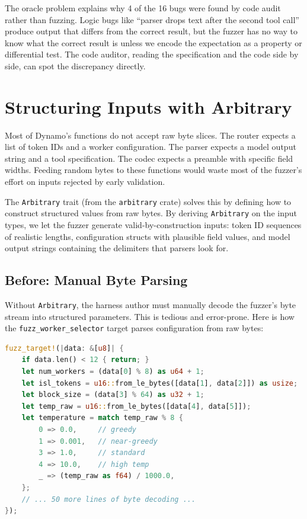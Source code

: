 \begin{notebox}
The oracle problem explains why 4 of the 16 bugs were found by code audit rather than fuzzing. Logic bugs like ``parser drops text after the second tool call'' produce output that differs from the correct result, but the fuzzer has no way to know what the correct result is unless we encode the expectation as a property or differential test. The code auditor, reading the specification and the code side by side, can spot the discrepancy directly.
\end{notebox}

\section{Structuring Inputs with Arbitrary}
\label{sec:fuzzing:arbitrary}

%
Most of Dynamo's functions do not accept raw byte slices. The router expects a list of token IDs and a worker configuration. The parser expects a model output string and a tool specification. The codec expects a preamble with specific field widths. Feeding random bytes to these functions would waste most of the fuzzer's effort on inputs rejected by early validation.

The \texttt{Arbitrary} trait (from the \texttt{arbitrary} crate) solves this by defining how to construct structured values from raw bytes. By deriving \texttt{Arbitrary} on the input types, we let the fuzzer generate valid-by-construction inputs: token ID sequences of realistic lengths, configuration structs with plausible field values, and model output strings containing the delimiters that parsers look for.

\subsection{Before: Manual Byte Parsing}

Without \texttt{Arbitrary}, the harness author must manually decode the fuzzer's byte stream into structured parameters. This is tedious and error-prone. Here is how the \texttt{fuzz\_worker\_selector} target parses configuration from raw bytes:

\begin{lstlisting}[language=Rust,caption={Manual input parsing: extracting structured fields from raw bytes.}]
fuzz_target!(|data: &[u8]| {
    if data.len() < 12 { return; }
    let num_workers = (data[0] % 8) as u64 + 1;
    let isl_tokens = u16::from_le_bytes([data[1], data[2]]) as usize;
    let block_size = (data[3] % 64) as u32 + 1;
    let temp_raw = u16::from_le_bytes([data[4], data[5]]);
    let temperature = match temp_raw % 8 {
        0 => 0.0,     // greedy
        1 => 0.001,   // near-greedy
        3 => 1.0,     // standard
        4 => 10.0,    // high temp
        _ => (temp_raw as f64) / 1000.0,
    };
    // ... 50 more lines of byte decoding ...
});
\end{lstlisting}


